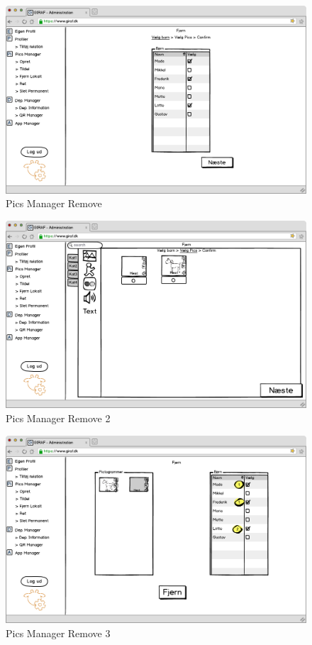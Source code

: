 \newpage

\begin{figure}[p]
\centering
\includegraphics[width=1\textwidth]{images/mockup/picsManagerFjern.png}
\caption{Pics Manager Remove}
\label{fig:pics_manager_remove}
\end{figure}

\begin{figure}[p]
\centering
\includegraphics[width=1\textwidth]{images/mockup/picsManagerFjern2.png}
\caption{Pics Manager Remove 2}
\label{fig:pics_manager_remove2}
\end{figure}

\newpage

\begin{figure}[p]
\centering
\includegraphics[width=1\textwidth]{images/mockup/picsManagerFjern3.png}
\caption{Pics Manager Remove 3}
\label{fig:pics_manager_remove3}
\end{figure}

